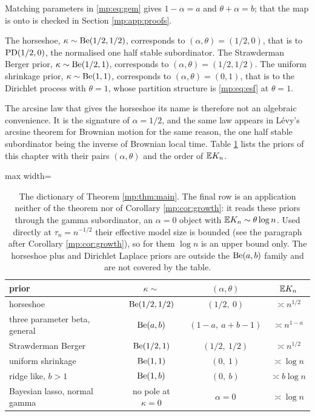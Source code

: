 Matching parameters in \eqref{mp:eq:gem} gives $1-\alpha=a$ and $\theta+\alpha=b$; that the map
is onto is checked in Section \ref{mp:app:proofs}.

\begin{corollary}
\label{mp:cor:cases}
The horseshoe, $\kappa\sim\mathrm{Be}(1/2,1/2)$, corresponds to $(\alpha,\theta)=(1/2,0)$, that is
to $\mathrm{PD}(1/2,0)$, the normalised one half stable subordinator. The Strawderman Berger prior,
$\kappa\sim\mathrm{Be}(1/2,1)$, corresponds to $(\alpha,\theta)=(1/2,1/2)$. The uniform shrinkage
prior, $\kappa\sim\mathrm{Be}(1,1)$, corresponds to $(\alpha,\theta)=(0,1)$, that is to the Dirichlet
process with $\theta=1$, whose partition structure is \eqref{mp:eq:esf} at $\theta=1$.
\end{corollary}

The arcsine law that gives the horseshoe its name is therefore not an algebraic convenience.
It is the signature of $\alpha=1/2$, and the same law appears in L\'evy's arcsine theorem
for Brownian motion for the same reason, the one half stable subordinator being the inverse
of Brownian local time. Table \ref{mp:tab:dict} lists the priors of this chapter with their pairs $(\alpha,\theta)$ and the order of $\mathbb{E} K_n$.

\begin{table}[t]
\centering
\begin{adjustbox}{max width=\textwidth}
\begin{tabular}{lccc}
\toprule
prior & $\kappa\sim$ & $(\alpha,\theta)$ & $\mathbb{E} K_n$ \\
\midrule
horseshoe & $\mathrm{Be}(1/2,1/2)$ & $(1/2,\ 0)$ & $\asymp n^{1/2}$ \\
three parameter beta, general & $\mathrm{Be}(a,b)$ & $(1-a,\ a+b-1)$ & $\asymp n^{1-a}$ \\
Strawderman Berger & $\mathrm{Be}(1/2,1)$ & $(1/2,\ 1/2)$ & $\asymp n^{1/2}$ \\
uniform shrinkage & $\mathrm{Be}(1,1)$ & $(0,\ 1)$ & $\asymp\log n$ \\
ridge like, $b>1$ & $\mathrm{Be}(1,b)$ & $(0,\ b)$ & $\asymp b\log n$ \\
Bayesian lasso, normal gamma & no pole at $\kappa=0$ & $\alpha=0$ & $\asymp\log n$ \\
\bottomrule
\end{tabular}
\end{adjustbox}
\caption{The dictionary of Theorem \ref{mp:thm:main}. The final row is an application neither of
the theorem nor of Corollary \ref{mp:cor:growth}: it reads these priors through the gamma
subordinator, an $\alpha=0$ object with $\mathbb{E} K_n\sim\theta\log n$. Used directly at
$\tau_n=n^{-1/2}$ their effective model size is bounded (see the paragraph after Corollary
\ref{mp:cor:growth}), so for them $\log n$ is an upper bound only. The horseshoe plus and Dirichlet Laplace
priors are outside the $\mathrm{Be}(a,b)$ family and are not covered by the table.}
\label{mp:tab:dict}
\end{table}

